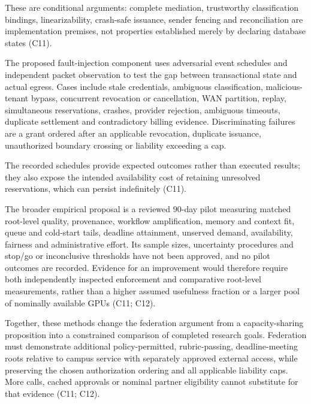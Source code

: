 \documentclass[11pt]{article}
\begin{document}
These are conditional arguments: complete mediation, trustworthy classification bindings, linearizability, crash-safe issuance, sender fencing and reconciliation are implementation premises, not properties established merely by declaring database states (C11).

The proposed fault-injection component uses adversarial event schedules and independent packet observation to test the gap between transactional state and actual egress. Cases include stale credentials, ambiguous classification, malicious-tenant bypass, concurrent revocation or cancellation, WAN partition, replay, simultaneous reservations, crashes, provider rejection, ambiguous timeouts, duplicate settlement and contradictory billing evidence. Discriminating failures are a grant ordered after an applicable revocation, duplicate issuance, unauthorized boundary crossing or liability exceeding a cap.

The recorded schedules provide expected outcomes rather than executed results; they also expose the intended availability cost of retaining unresolved reservations, which can persist indefinitely (C11).

The broader empirical proposal is a reviewed $90$-day pilot measuring matched root-level quality, provenance, workflow amplification, memory and context fit, queue and cold-start tails, deadline attainment, unserved demand, availability, fairness and administrative effort. Its sample sizes, uncertainty procedures and stop/go or inconclusive thresholds have not been approved, and no pilot outcomes are recorded. Evidence for an improvement would therefore require both independently inspected enforcement and comparative root-level measurements, rather than a higher assumed usefulness fraction or a larger pool of nominally available GPUs (C11; C12).

Together, these methods change the federation argument from a capacity-sharing proposition into a constrained comparison of completed research goals. Federation must demonstrate additional policy-permitted, rubric-passing, deadline-meeting roots relative to campus service with separately approved external access, while preserving the chosen authorization ordering and all applicable liability caps. More calls, cached approvals or nominal partner eligibility cannot substitute for that evidence (C11; C12).
\end{document}

